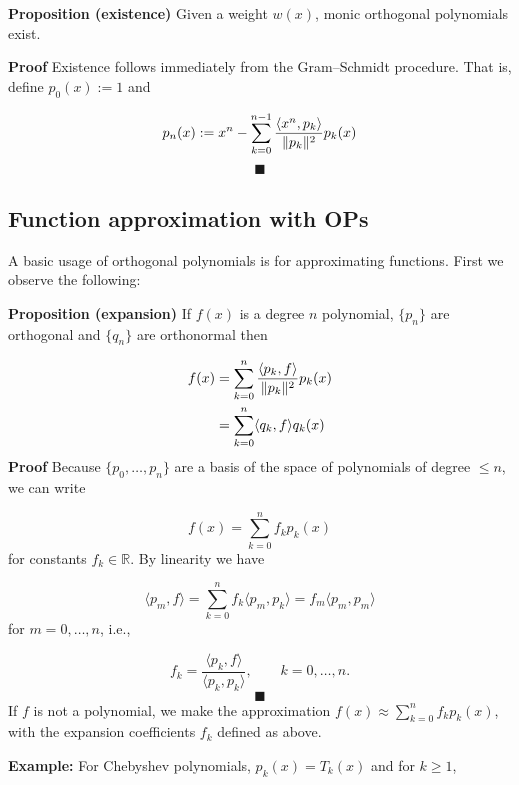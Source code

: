 \documentclass[12pt,landscape]{article}
\def\bbR{ {\mathbb R} }
\def\endash{–}
\begin{document}
{\textbf{Proposition (existence)} Given a weight $w(x)$, monic orthogonal polynomials exist.

\textbf{Proof}  Existence follows immediately from the Gram\ensuremath{\endash}Schmidt procedure. That is, define $p_0(x) := 1$ and

\[
p_n(x) := x^n - \ensuremath{\sum}_{k=0}^{n-1} {\ensuremath{\langle}x^n,p_k\ensuremath{\rangle} \over \|p_k\|^2} p_k(x)
\]
\[
\blacksquare
\]
\subsection{Function approximation with OPs}
A basic usage of orthogonal polynomials is for approximating functions. First we observe the following:

\textbf{Proposition (expansion)} If $f(x)$ is a degree $n$ polynomial, $\{p_n\}$ are orthogonal and $\{q_n\}$ are orthonormal then


\begin{align*}
f(x) &= \sum_{k=0}^n {\ensuremath{\langle}p_k,f\ensuremath{\rangle} \over \|p_k\|^2} p_k(x) \\
     &    = \sum_{k=0}^n \ensuremath{\langle}q_k,f\ensuremath{\rangle} q_k(x)
\end{align*}
\textbf{Proof} Because $\{p_0,\ensuremath{\ldots},p_n \}$ are a basis of the space of polynomials of degree $\leq n$, we can write

\[
f(x) = \sum_{k=0}^n f_k p_k(x)
\]
for constants $f_k \ensuremath{\in} \ensuremath{\bbR}$. By linearity we have

\[
\ensuremath{\langle}p_m,f\ensuremath{\rangle} = \sum_{k=0}^n f_k \ensuremath{\langle}p_m,p_k\ensuremath{\rangle}= f_m \ensuremath{\langle}p_m,p_m\ensuremath{\rangle}
\]
for $m = 0, \ldots, n$, i.e.,

\[
f_k = \frac{\langle p_k,f \rangle}{\langle p_k,p_k \rangle}, \qquad k = 0, \ldots, n.
\]
\[
\blacksquare
\]
If $f$ is not a polynomial, we make the approximation $f(x) \approx \sum_{k=0}^n f_k p_k(x)$, with the expansion coefficients $f_k$ defined as above. 

\textbf{Example:}  For Chebyshev polynomials, $p_k(x) = T_k(x)$ and for $k \geq 1$,


}
\end{document}

